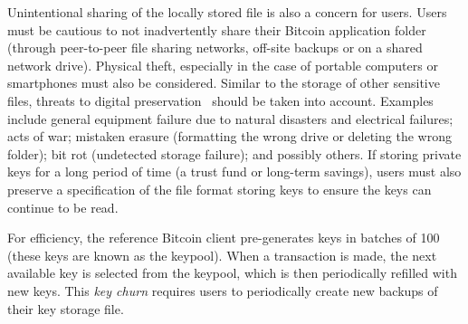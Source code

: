 
Unintentional sharing of the locally stored file is also a concern for users. Users must be cautious to not inadvertently share their Bitcoin application folder (\eg through peer-to-peer file sharing networks, off-site backups or on a shared network drive). Physical theft, especially in the case of portable computers or smartphones must also be considered. Similar to the storage of other sensitive files, threats to digital preservation~\cite{BKM05} should be taken into account. Examples include general equipment failure due to natural disasters and electrical failures; acts of war; mistaken erasure (\eg formatting the wrong drive or deleting the wrong folder); bit rot (\ie undetected storage failure); and possibly others. If storing private keys for a long period of time (\eg a trust fund or long-term savings), users must also preserve a specification of the file format storing keys to ensure the keys can continue to be read.

For efficiency, the reference Bitcoin client pre-generates keys in batches of 100 (these keys are known as the keypool). When a transaction is made, the next available key is selected from the keypool, which is then periodically refilled with new keys. This \emph{key churn} requires users to periodically create new backups of their key storage file. 




